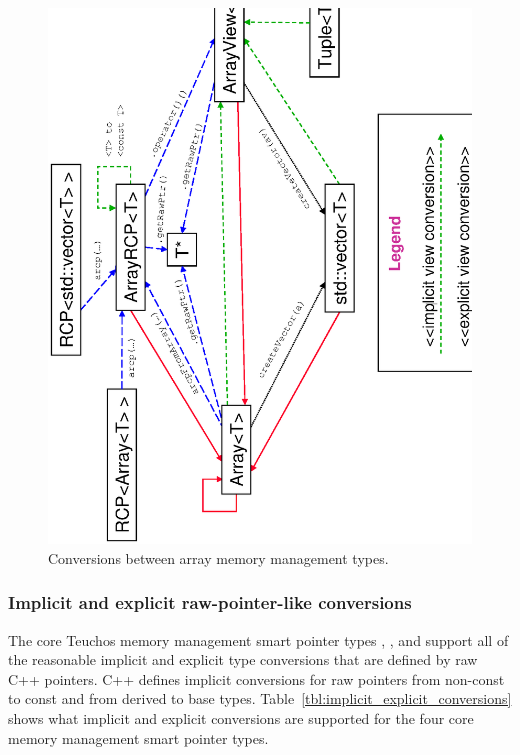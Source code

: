 \documentclass[pdf,ps2pdf,11pt]{SANDreport}
\begin{document}
{\bsinglespace
\begin{figure}
\begin{center}
\includegraphics*[angle=270,scale=0.65]{TeuchosArrayConversions}
\end{center}
\caption{
\label{fig:TeuchosArrayConversions}
Conversions between array memory management types.  }
\end{figure}
\esinglespace}


%
{}\subsubsection{Implicit and explicit raw-pointer-like conversions}
\label{sec:raw-pointer-like-type-conversions}
%

The core Teuchos memory management smart pointer types {},
{}, {} and {} support all of the
reasonable implicit and explicit type conversions that are defined by
raw C++ pointers.  C++ defines implicit conversions for raw pointers
from non-const to const and from derived to base types.
Table~\ref{tbl:implicit_explicit_conversions} shows what implicit and
explicit conversions are supported for the four core memory management
smart pointer types.
\end{document}
